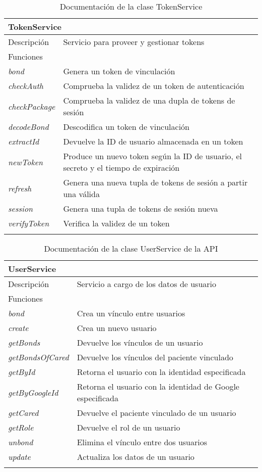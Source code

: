 \vspace{-10pt}
\begin{longtable}{|p{} p{}|}
    \hline
    \multicolumn{2}{|l|}{\textbf{TokenService}} \\ \hline \hline
    Descripción      & Servicio para proveer y gestionar tokens \\ \hline
    \multicolumn{2}{|l|}{Funciones} \\
    \emph{bond}  & Genera un token de vinculación  \\
    \emph{checkAuth}  & Comprueba la validez de un token de autenticación  \\
    \emph{checkPackage}  & Comprueba la validez de una dupla de tokens de sesión  \\
    \emph{decodeBond}  & Descodifica un token de vinculación  \\
    \emph{extractId}  & Devuelve la ID de usuario almacenada en un token  \\
    \emph{newToken}  & Produce un nuevo token según la ID de usuario, el secreto y el tiempo de expiración  \\
    \emph{refresh}  & Genera una nueva tupla de tokens de sesión a partir una válida \\
    \emph{session}  & Genera una tupla de tokens de sesión nueva  \\
    \emph{verifyToken}  & Verifica la validez de un token  \\ \hline
    \caption{Documentación de la clase TokenService}
    \label{dis:api:token_service}
\end{longtable}

\begin{longtable}{|p{} p{}|}
    \hline
    \multicolumn{2}{|l|}{\textbf{UserService}} \\ \hline \hline
    Descripción      & Servicio a cargo de los datos de usuario \\ \hline
    \multicolumn{2}{|l|}{Funciones} \\
    \emph{bond}  & Crea un vínculo entre usuarios  \\
    \emph{create}  & Crea un nuevo usuario \\
    \emph{getBonds}  & Devuelve los vínculos de un usuario  \\
    \emph{getBondsOfCared}  & Devuelve los vínculos del paciente vinculado  \\
    \emph{getById}  & Retorna el usuario con la identidad especificada  \\
    \emph{getByGoogleId}  & Retorna el usuario con la identidad de Google especificada  \\
    \emph{getCared}  & Devuelve el paciente vinculado de un usuario  \\
    \emph{getRole}  & Devuelve el rol de un usuario  \\
    \emph{unbond} & Elimina el vínculo entre dos usuarios \\
    \emph{update}  & Actualiza los datos de un usuario  \\ \hline
    \caption{Documentación de la clase UserService de la API}
    \label{dis:api:user_service}
\end{longtable}

